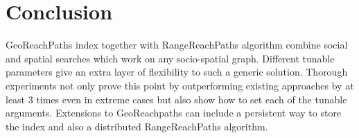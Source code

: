 \section{Conclusion}
GeoReachPaths index together with RangeReachPaths algorithm combine social and spatial searches which work on any socio-spatial graph. Different tunable parameters give an extra layer of flexibility to such a generic solution. Thorough experiments not only prove this point by outperforming existing approaches by at least 3 times even in extreme cases but also show how to set each of the tunable arguments. Extensions to GeoReachpaths can include a persistent way to store the index and also a distributed RangeReachPaths algorithm.
